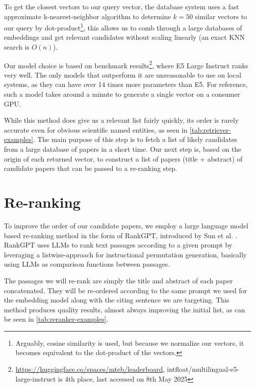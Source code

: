 \documentclass[12pt,a4paper]{report}
\begin{document}
\newpage

To get the closest vectors to our query vector, the database system uses a fast approximate k-nearest-neighbor algorithm to determine \(k=50\) similar vectors to our query by dot-product\footnote{Arguably, cosine similarity is used, but because we normalize our vectors, it becomes equivalent to the dot-product of the vectors.}, this allows us to comb through a large databases of embeddings and get relevant candidates without scaling linearly (an exact KNN search is \(O(n)\)).

Our model choice is based on benchmark results\footnote{\url{https://huggingface.co/spaces/mteb/leaderboard}, intfloat/multilingual-e5-large-instruct is 4th place, last accessed on 8th May 2025}, where E5 Large Instruct \cite{Wang2024MultilingualET} ranks very well. The only models that outperform it are unreasonable to use on local systems, as they can have over 14 times more parameters than E5. For reference, such a model takes around a minute to generate a single vector on a consumer GPU.

While this method does give us a relevant list fairly quickly, its order is rarely accurate even for obvious scientific named entities, as seen in \autoref{tab:retriever-examples}. The main purpose of this step is to fetch a list of likely candidates from a large database of papers in a short time. Our next step is, based on the origin of each returned vector, to construct a list of papers (title + abstract) of candidate papers that can be passed to a re-ranking step.

\section{Re-ranking}

To improve the order of our candidate papers, we employ a large language model based re-ranking method in the form of RankGPT, introduced by Sun et al. \cite{Sun2023IsCG,Sun2023InstructionDM}. RankGPT uses LLMs to rank text passages according to a given prompt by leveraging a listwise-approach for instructional permutation generation, basically using LLMs as comparison functions between passages.

The passages we will re-rank are simply the title and abstract of each paper concatenated. They will be re-ordered according to the same prompt we used for the embedding model along with the citing sentence we are targeting. This method produces quality results, almost always improving the initial list, as can be seen in \autoref{tab:reranker-examples}.
\end{document}
